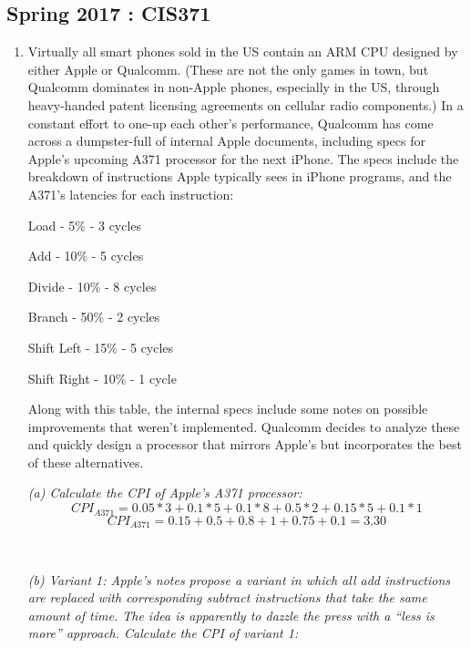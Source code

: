 \documentclass[12pt]{article}
\newenvironment{QandA}{\begin{enumerate}[label=\bfseries\alph*.]\bfseries}
                      {\end{enumerate}}
\newenvironment{answered}{\par\quad\normalfont}{}
\begin{document}
\subsection{Spring 2017 : CIS371}

\begin{QandA}
   \item Virtually all smart phones sold in the US contain an ARM CPU designed by either Apple or Qualcomm.
    (These are not the only games in town, but Qualcomm dominates in non-Apple phones, especially
    in the US, through heavy-handed patent licensing agreements on cellular radio components.) In a
    constant effort to one-up each other’s performance, Qualcomm has come across a dumpster-full of
    internal Apple documents, including specs for Apple’s upcoming A371 processor for the next iPhone.
    The specs include the breakdown of instructions Apple typically sees in iPhone programs, and the
    A371’s latencies for each instruction:

    Load - 5\% - 3 cycles

    Add - 10\% - 5 cycles

    Divide - 10\% - 8 cycles

    Branch - 50\% - 2 cycles

    Shift Left - 15\% - 5 cycles

    Shift Right - 10\% - 1 cycle
    
    Along with this table, the internal specs include some notes on possible improvements that weren’t
    implemented. Qualcomm decides to analyze these and quickly design a processor that mirrors Apple’s
    but incorporates the best of these alternatives.

    \begin{answered}
    
    \textit{(a) Calculate the CPI of Apple’s A371 processor:}
    \begin{equation*}
        CPI_{A371} = 0.05 * 3 + 0.1 * 5 + 0.1 * 8 + 0.5 * 2 + 0.15 * 5 + 0.1 * 1
    \end{equation*}
    \begin{equation*}
        CPI_{A371} = 0.15 + 0.5 + 0.8 + 1 + 0.75 + 0.1 = 3.30
    \end{equation*}
    
    \ 
    
    \textit{(b) Variant 1: Apple’s notes propose a variant in which all add instructions are replaced with corresponding subtract instructions that take the same amount of time. The idea is apparently to dazzle the press with a “less is more” approach. Calculate the CPI of variant 1:}
    

\end{answered}
\end{QandA}
\end{document}
